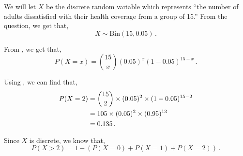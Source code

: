 %
%


\begin{subquestions}
	
\subquestion

\begin{subsubquestions}
	
\subsubquestion

\begin{subsubsubquestions}
	
\subsubsubquestion

We will let $X$ be the discrete random variable which represents ``the number of adults dissatisfied with their health coverage from a group of 15.'' From the question,  we get that,
\begin{equation}
	X \sim \text{Bin}(15, 0.05) \,.
\end{equation}
	
From , we get that,
\begin{equation}
	P(X = x) = { 15 \choose x} (0.05)^x (1-0.05)^{15-x} \,. \label{2005:q4:Bin1}
\end{equation}

Using , we can find that,
\begin{align}
	P(X=2) & = { 15 \choose 2} \times (0.05)^2 \times (1-0.05)^{15-2} \nonumber \\
	       & = 105 \times (0.05)^2 \times (0.95)^{13} \nonumber \\
	       & = 0.135 \,.
\end{align}


\subsubsubquestion

Since $X$ is discrete, we know that,
\begin{equation}
	P(X>2) = 1 - (P(X=0)+P(X=1)+P(X=2)) \,. \label{2005:q4:DisBin}
\end{equation}


\end{subsubsubquestions}
\end{subsubquestions}
\end{subquestions}
